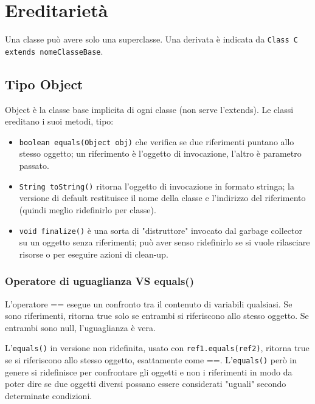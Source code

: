 
\chapter{Ereditarietà}

Una classe può avere solo una superclasse. Una derivata è indicata da \texttt{Class C extends nomeClasseBase{}}. 

\section{Tipo Object} %
Object è la classe base implicita di ogni classe (non serve l'extends). Le classi ereditano i suoi metodi, tipo:
\begin{itemize}
\item \texttt{boolean equals(Object obj)} che verifica se due riferimenti puntano allo stesso oggetto; un riferimento è l'oggetto di invocazione, l'altro è parametro passato. 
\item \texttt{String toString()} ritorna l'oggetto di invocazione in formato stringa; la versione di default restituisce il nome della classe e l'indirizzo del riferimento (quindi meglio ridefinirlo per classe).
\item \texttt{void finalize()} è una sorta di "distruttore" invocato dal garbage collector su un oggetto senza riferimenti; può aver senso ridefinirlo se si vuole rilasciare risorse o per eseguire azioni di clean-up.
\end{itemize}

\subsection{Operatore di uguaglianza VS equals()} %
L'operatore == esegue un confronto tra il contenuto di variabili qualsiasi. Se sono riferimenti, ritorna true solo se entrambi si riferiscono allo stesso oggetto. Se entrambi sono null, l'uguaglianza è vera.

L'\texttt{equals()} in versione non ridefinita, usato con \texttt{ref1.equals(ref2)}, ritorna true se si riferiscono allo stesso oggetto, esattamente come ==. L'\texttt{equals()} però in genere si ridefinisce per confrontare gli oggetti e non i riferimenti in modo da poter dire se due oggetti diversi possano essere considerati "uguali" secondo determinate condizioni.

